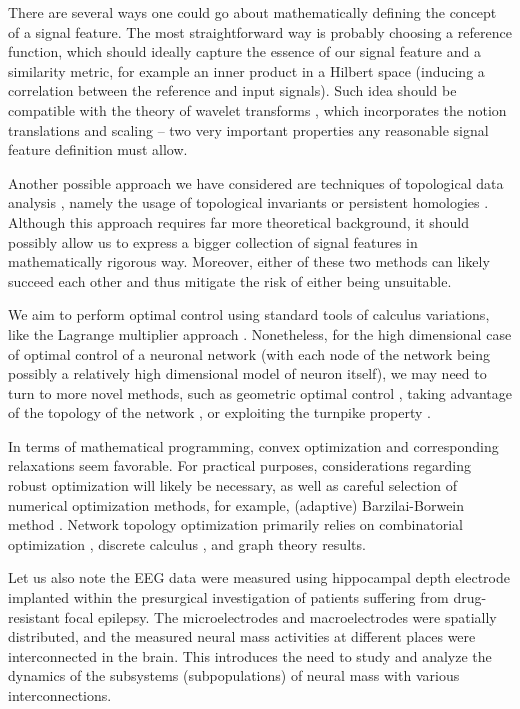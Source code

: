 \documentclass[a4paper,11pt]{scrartcl}
\begin{document}
There are several ways one could go about mathematically defining the concept of a signal feature. The most straightforward way is probably choosing a reference function, which should ideally capture the essence of our signal feature and a similarity metric, for example an inner product in a Hilbert space (inducing a correlation between the reference and input signals). Such idea should be compatible with the theory of wavelet transforms \cite{Gupta2005, Ganjalizadeh2022, Dirkx2023, Brochard2022, Rocha2011}, which incorporates the notion translations and scaling \cite{Mallat2009} -- two very important properties any reasonable signal feature definition must allow.

Another possible approach we have considered are techniques of topological data analysis \cite{Edelsbrunner2010}, namely the usage of topological invariants or persistent homologies \cite{Carriere2021, Nigmetov2024, Myers2022}. Although this approach requires far more theoretical background, it should possibly allow us to express a bigger collection of signal features in mathematically rigorous way. Moreover, either of these two methods can likely succeed each other and thus mitigate the risk of either being unsuitable.

We aim to perform optimal control using standard tools of calculus variations, like the Lagrange multiplier approach \cite{Kunisch2008}. Nonetheless, for the high dimensional case of optimal control of a neuronal network (with each node of the network being possibly a relatively high dimensional model of neuron itself), we may need to turn to more novel methods, such as geometric optimal control \cite{Jurdjevic1996, Agrachev2004}, taking advantage of the topology of the network \cite{Gao2022, Nishikawa2006, Gueant2019}, or exploiting the turnpike property \cite{Zaslavski2023, Gugat2024}.

In terms of mathematical programming, convex optimization \cite{Boyd2004} and corresponding relaxations \cite{Eltved2021} seem favorable. For practical purposes, considerations regarding robust optimization \cite{Ben-Tal2009} will likely be necessary, as well as careful selection of numerical optimization methods, for example, (adaptive) Barzilai-Borwein method \cite{Zhou2024}. Network topology optimization primarily relies on combinatorial optimization \cite{Korte2005, Dai2011, Osmolovskii2023}, discrete calculus \cite{Grady2010}, and graph theory results.

Let us also note the EEG data \cite{Brazdil2017} were measured using hippocampal depth electrode implanted within the presurgical investigation of patients suffering from drug-resistant focal epilepsy. The microelectrodes and macroelectrodes were spatially distributed, and the measured neural mass activities at different places were interconnected in the brain. This introduces the need to study and analyze the dynamics of the subsystems (subpopulations) of neural mass with various interconnections.
\end{document}
